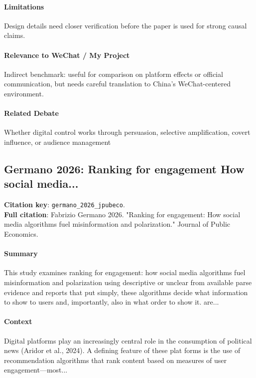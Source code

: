 \documentclass[12pt]{article}
\begin{document}
\paragraph{Limitations} Design details need closer verification before the paper is used for strong causal claims.

\paragraph{Relevance to WeChat / My Project} Indirect benchmark: useful for comparison on platform effects or official communication, but needs careful translation to China's WeChat-centered environment.

\paragraph{Related Debate} Whether digital control works through persuasion, selective amplification, covert influence, or audience management


\subsection{Germano 2026: Ranking for engagement How social media...}
\textbf{Citation key}: \texttt{germano\_2026\_jpubeco}.\\
\textbf{Full citation}: Fabrizio Germano 2026. "Ranking for engagement: How social media algorithms fuel misinformation and polarization." Journal of Public Economics.

\paragraph{Summary} This study examines ranking for engagement: how social media algorithms fuel misinformation and polarization using descriptive or unclear from available parse evidence and reports that put simply, these algorithms decide what information to show to users and, importantly, also in what order to show it. are...

\paragraph{Context} Digital platforms play an increasingly central role in the consumption of political news (Aridor et al., 2024). A defining feature of these plat forms is the use of recommendation algorithms that rank content based on measures of user engagement---most...
\end{document}
